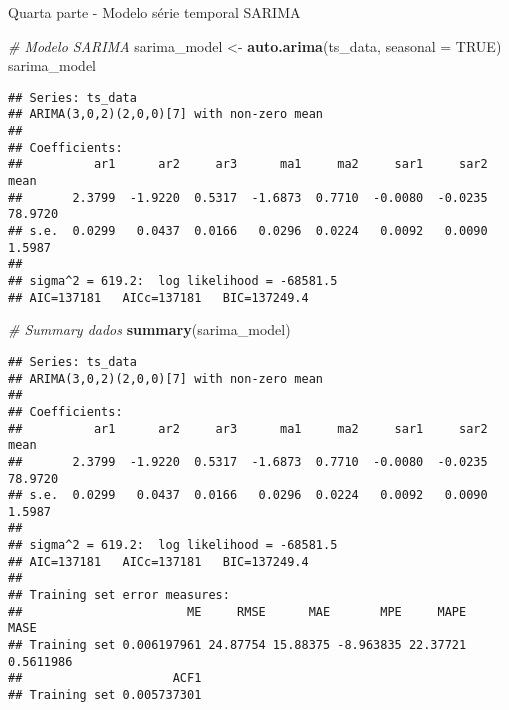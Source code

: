 \documentclass[
]{article}
\newenvironment{Shaded}{\begin{snugshade}}{\end{snugshade}}
\newcommand{\AttributeTok}[1]{\textcolor[rgb]{0.13,0.29,0.53}{#1}}
\newcommand{\CommentTok}[1]{\textcolor[rgb]{0.56,0.35,0.01}{\textit{#1}}}
\newcommand{\ConstantTok}[1]{\textcolor[rgb]{0.56,0.35,0.01}{#1}}
\newcommand{\DecValTok}[1]{\textcolor[rgb]{0.00,0.00,0.81}{#1}}
\newcommand{\FunctionTok}[1]{\textcolor[rgb]{0.13,0.29,0.53}{\textbf{#1}}}
\newcommand{\NormalTok}[1]{#1}
\newcommand{\OtherTok}[1]{\textcolor[rgb]{0.56,0.35,0.01}{#1}}
\newcommand{\SpecialCharTok}[1]{\textcolor[rgb]{0.81,0.36,0.00}{\textbf{#1}}}
\begin{document}
Quarta parte - Modelo série temporal SARIMA

\begin{Shaded}
\end{Shaded}

\begin{Shaded}
\begin{Highlighting}[]
\CommentTok{\# Modelo SARIMA}
\NormalTok{sarima\_model }\OtherTok{\textless{}{-}} \FunctionTok{auto.arima}\NormalTok{(ts\_data, }\AttributeTok{seasonal =} \ConstantTok{TRUE}\NormalTok{)}
\NormalTok{sarima\_model}
\end{Highlighting}
\end{Shaded}

\begin{verbatim}
## Series: ts_data 
## ARIMA(3,0,2)(2,0,0)[7] with non-zero mean 
## 
## Coefficients:
##          ar1      ar2     ar3      ma1     ma2     sar1     sar2     mean
##       2.3799  -1.9220  0.5317  -1.6873  0.7710  -0.0080  -0.0235  78.9720
## s.e.  0.0299   0.0437  0.0166   0.0296  0.0224   0.0092   0.0090   1.5987
## 
## sigma^2 = 619.2:  log likelihood = -68581.5
## AIC=137181   AICc=137181   BIC=137249.4
\end{verbatim}

\begin{Shaded}
\begin{Highlighting}[]
\CommentTok{\# Summary dados}
\FunctionTok{summary}\NormalTok{(sarima\_model)}
\end{Highlighting}
\end{Shaded}

\begin{verbatim}
## Series: ts_data 
## ARIMA(3,0,2)(2,0,0)[7] with non-zero mean 
## 
## Coefficients:
##          ar1      ar2     ar3      ma1     ma2     sar1     sar2     mean
##       2.3799  -1.9220  0.5317  -1.6873  0.7710  -0.0080  -0.0235  78.9720
## s.e.  0.0299   0.0437  0.0166   0.0296  0.0224   0.0092   0.0090   1.5987
## 
## sigma^2 = 619.2:  log likelihood = -68581.5
## AIC=137181   AICc=137181   BIC=137249.4
## 
## Training set error measures:
##                       ME     RMSE      MAE       MPE     MAPE      MASE
## Training set 0.006197961 24.87754 15.88375 -8.963835 22.37721 0.5611986
##                     ACF1
## Training set 0.005737301
\end{verbatim}
\end{document}
